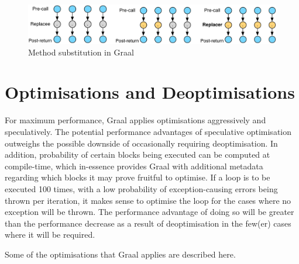 \begin{figure}
	\centering
	\includegraphics[width=\textwidth]{graphics/graph-replacement.pdf}
	\caption{Method substitution in Graal}
	\label{fig:method-subs}
\end{figure}

\section{Optimisations and Deoptimisations} \label{sec:graal/deopt}
For maximum performance, Graal applies optimisations aggressively and speculatively. The potential performance advantages of speculative optimisation outweighs the possible downside of occasionally requiring deoptimisation. In addition, probability of certain blocks being executed can be computed at compile-time, which in-essence provides Graal with additional metadata regarding which blocks it may prove fruitful to optimise. If a loop is to be executed 100 times, with a low probability of exception-causing errors being thrown per iteration, it makes sense to optimise the loop for the cases where no exception will be thrown. The performance advantage of doing so will be greater than the performance decrease as a result of deoptimisation in the few(er) cases where it will be required.

Some of the optimisations that Graal applies are described here.

